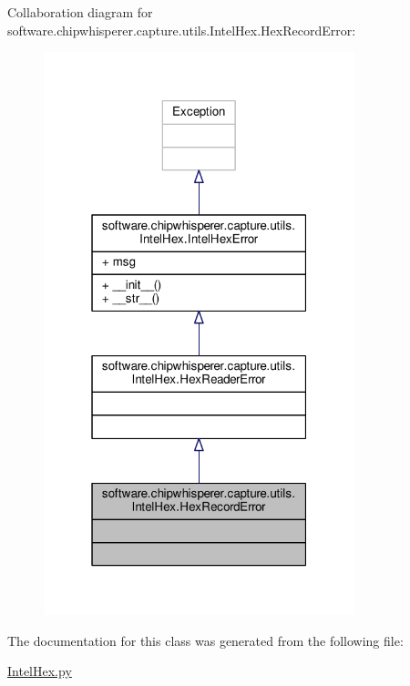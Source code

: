 Collaboration diagram for software.\+chipwhisperer.\+capture.\+utils.\+Intel\+Hex.\+Hex\+Record\+Error\+:\nopagebreak
\begin{figure}[H]
\begin{center}
\leavevmode
\includegraphics[width=256pt]{da/d3a/classsoftware_1_1chipwhisperer_1_1capture_1_1utils_1_1IntelHex_1_1HexRecordError__coll__graph}
\end{center}
\end{figure}


The documentation for this class was generated from the following file\+:\begin{DoxyCompactItemize}
\item 
\hyperlink{IntelHex_8py}{Intel\+Hex.\+py}\end{DoxyCompactItemize}
